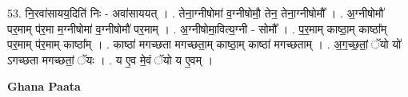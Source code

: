 \documentclass[17pt]{extarticle}
\begin{document}
53. नि॒रवा॑सायय॒दिति॑ निः - अवा॑साययत् । . तेना॒ग्नीषोमा॑ व॒ग्नीषोमौ॒ तेन॒ तेना॒ग्नीषोमौ᳚ । . अ॒ग्नीषोमौ॑ पर॒माम् प॑र॒मा म॒ग्नीषोमा॑ व॒ग्नीषोमौ॑ पर॒माम् । . अ॒ग्नीषोमा॒वित्य॒ग्नी - सोमौ᳚ । . प॒र॒माम् काष्ठा॒म् काष्ठा᳚म् पर॒माम् प॑र॒माम् काष्ठा᳚म् । . काष्ठा॑ मगच्छता मगच्छता॒म् काष्ठा॒म् काष्ठा॑ मगच्छताम् । . अ॒ग॒च्छ॒तां॒ ॅयो यो॑ ऽगच्छता मगच्छतां॒ ॅयः । . य ए॒व मे॒वं ॅयो य ए॒वम् । \newline

\textbf{Ghana Paata } \newline
\end{document}
